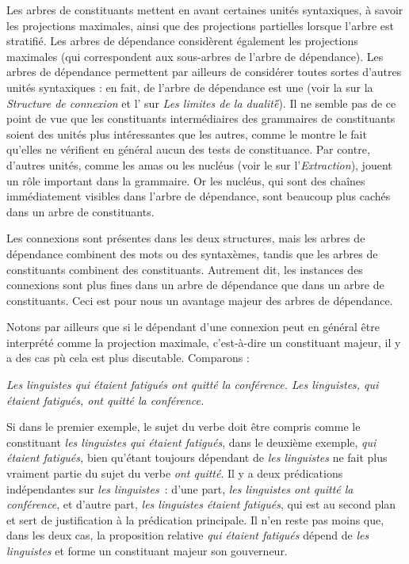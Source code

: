 {    
    Les arbres de constituants mettent en avant certaines unités syntaxiques, à savoir les projections maximales, ainsi que des projections partielles lorsque l’arbre est stratifié. Les arbres de dépendance considèrent également les projections maximales (qui correspondent aux sous-arbres de l’arbre de dépendance). Les arbres de dépendance permettent par ailleurs de considérer toutes sortes d’autres unités syntaxiques : en fait,  de l’arbre de dépendance est une  (voir la  sur la \textit{Structure de connexion} et l' sur \textit{{Les limites de la dualité}}́). Il ne semble pas de ce point de vue que les constituants intermédiaires des grammaires de constituants soient des unités plus intéressantes que les autres, comme le montre le fait qu’elles ne vérifient en général aucun des tests de constituance. Par contre, d’autres unités, comme les amas ou les nucléus (voir le  sur l’\textit{Extraction}), jouent un rôle important dans la grammaire. Or les nucléus, qui sont des chaînes immédiatement visibles dans l’arbre de dépendance, sont beaucoup plus cachés dans un arbre de constituants.

    Les connexions sont présentes dans les deux structures, mais les arbres de dépendance combinent des mots ou des syntaxèmes, tandis que les arbres de constituants combinent des constituants. Autrement dit, les instances des connexions sont plus fines dans un arbre de dépendance que dans un arbre de constituants. Ceci est pour nous un avantage majeur des arbres de dépendance.

    Notons par ailleurs que si le dépendant d’une connexion peut en général être interprété comme la projection maximale, c’est-à-dire un constituant majeur, il y a des cas pù cela est plus discutable. Comparons :

    \ea
    \ea \itshape Les linguistes qui étaient fatigués ont quitté la conférence.
    \ex \itshape Les linguistes, qui étaient fatigués, ont quitté la conférence.
    \z
    \z

    Si dans le premier exemple, le sujet du verbe doit être compris comme le constituant \textit{les linguistes qui étaient fatigués}, dans le deuxième exemple, \textit{qui étaient fatigués,} bien qu’étant toujours dépendant de \textit{les linguistes} ne fait plus vraiment partie du sujet du verbe \textit{ont quitté}. Il y a deux prédications indépendantes sur \textit{les linguistes~}: d’une part, \textit{les linguistes ont quitté la conférence}, et d’autre part, \textit{les linguistes étaient fatigués}, qui est au second plan et sert de justification à la prédication principale.
    Il n'en reste pas moins que, dans les deux cas, la proposition relative \textit{qui étaient fatigués} dépend de \textit{les linguistes} et forme un constituant majeur son gouverneur.

}
